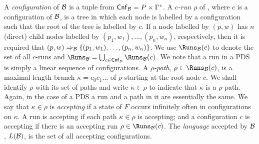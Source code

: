 \documentclass{llncs}
\begin{document}
A \emph{configuration} of $\mathcal{B}$ is a tuple from $\mathsf{Cnf}_\mathcal{B}=P\times\Gamma^*$. A \emph{$c$-run $\rho$} of \ABPDS, where  $c$ is a configuration of $\mathcal{B}$, is a tree in which  each node is labelled by a configuration such that the root of the tree is labelled by $c$.  If a node labelled by $(p,w)$ has $n$ (direct) child nodes labelled by $(p_1,w_1),\ldots,(p_n,w_n)$, respectively,  then it is required that $(p,w)\Rightarrow_\mathcal{B}\{(p_1,w_1),\ldots,(p_n,w_n)\}$. We use $\Runs_\ABPDS(c)$ to denote the set of all $c$-runs and $\Runs_\ABPDS=\bigcup_{c\in\Cnf_\ABPDS}\Runs_\ABPDS(c)$. We note that a run in a PDS \PDS is simply a linear sequence of configurations. A \emph{$\rho$-path},  $\rho\in\Runs_\ABPDS(c)$,  is a maximal length branch $\kappa=c_0c_1\ldots$ of $\rho$ starting at the root node $c$. We shall identify $\rho$ with its set of paths and write $\kappa\in\rho$ to indicate that $\kappa$ is a $\rho$-path. Again, in the case of a PDS \PDS a run and a path in it are essentially the same. We say that $\kappa\in\rho$ is \emph{accepting} if a state of $F$ occurs infinitely often in configurations on $\kappa$. A run is accepting if each path $\kappa\in\rho$  is accepting; and a configuration $c$ is accepting if there is an accepting run $\rho\in\Runs_\ABPDS(c)$. The \emph{language} accepted by $\mathcal{B}$, $L(\mathcal{B})$, is the set of all accepting configurations. 
\end{document}
